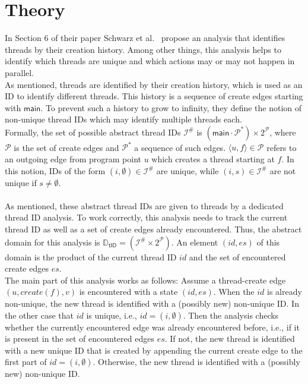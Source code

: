   \section{Theory}\label{sec:threadTheory}
  In Section 6 of their paper Schwarz et al.~\parencite{schwarz2023clustered} propose an analysis that identifies threads by their creation history. Among other things, this analysis helps to identify which threads are unique and which actions may or may not happen in parallel.\\
  As mentioned, threads are identified by their creation history, which is used as an ID to identify different threads. This history is a sequence of create edges starting with $\textsf{main}$. To prevent such a history to grow to infinity, they define the notion of non-unique thread IDs which may identify multiple threads each.\\
  Formally, the set of possible abstract thread IDs $\mathcal{I}^{\#}$ is $(\textsf{main}\cdot\mathcal{P}^*) \times 2^{\mathcal{P}}$, where $\mathcal{P}$ is the set of create edges and $\mathcal{P}^*$ a sequence of such edges. $\langle u, f \rangle \in \mathcal{P}$ refers to an outgoing edge from program point $u$ which creates a thread starting at $f$.
  In this notion, IDs of the form $(i, \emptyset) \in \mathcal{I}^{\#}$ are unique, while $(i, s) \in \mathcal{I}^{\#}$ are not unique if $s \neq \emptyset$.\\
  \\
  As mentioned, these abstract thread IDs are given to threads by a dedicated thread ID analysis. To work correctly, this analysis needs to track the current thread ID as well as a set of create edges already encountered. Thus, the abstract domain for this analysis is $\mathbb{D}_\textsf{tID} = (\mathcal{I}^{\#} \times 2^{\mathcal{P}})$. An element $(id, es)$ of this domain is the product of the current thread ID $id$ and the set of encountered create edges $es$.\\
  The main part of this analysis works as follows: Assume a thread-create edge $(u, create(f), v)$ is encountered with a state $(id, es)$. When the $id$ is already non-unique, the new thread is identified with a (possibly new) non-unique ID. In the other case that $id$ is unique, i.e., $id = (i, \emptyset)$. Then the analysis checks whether the currently encountered edge was already encountered before, i.e., if it is present in the set of encountered edges $es$. If not, the new thread is identified with a new unique ID that is created by appending the current create edge to the first part of $id = (i, \emptyset)$. Otherwise, the new thread is identified with a (possibly new) non-unique ID.\\
